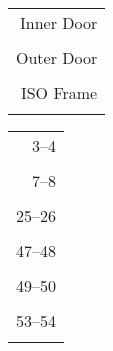 
\begin{tabular}{r}
Inner Door\\ \\
Outer Door\\ \\
ISO Frame \\ \\
\end{tabular}
\begin{tabular}{r}
3--4 \\ \\
7--8 \\ \\
25--26 \\ \\
47--48 \\ \\
49--50 \\ \\
53--54 \\ \\
\end{tabular}


